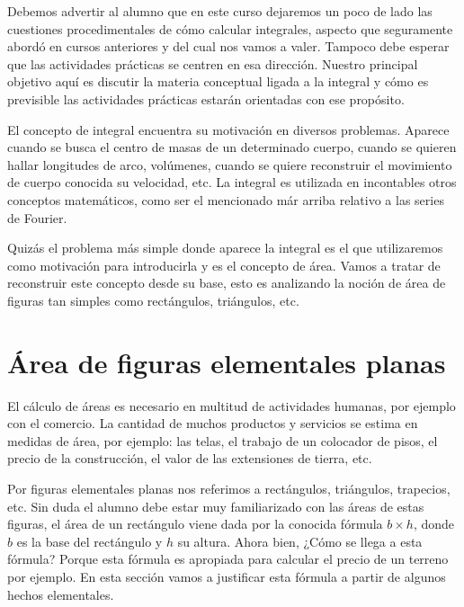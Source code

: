 Debemos advertir  al alumno que en este curso dejaremos un poco de lado las cuestiones procedimentales de cómo calcular integrales, aspecto que seguramente abordó en cursos anteriores y del cual nos vamos a valer. Tampoco debe esperar que las actividades prácticas se centren en esa dirección.   Nuestro principal objetivo aquí es discutir la materia conceptual ligada a la integral y cómo es previsible las actividades prácticas estarán orientadas con ese propósito.


El concepto de integral encuentra su motivación en diversos problemas. Aparece cuando se busca el centro de masas de un determinado cuerpo, cuando se quieren hallar longitudes de arco, volúmenes, cuando se quiere reconstruir el movimiento de cuerpo conocida su velocidad, etc. La integral es utilizada en incontables otros conceptos matemáticos, como ser el mencionado már arriba relativo a las series de Fourier. 

Quizás el 
problema más simple donde aparece la integral es el que utilizaremos como motivación para introducirla y es el concepto de área.  Vamos a tratar de reconstruir este concepto desde su base, esto es analizando la noción de área de figuras tan simples como rectángulos, triángulos, etc. 



\section{Área de figuras elementales planas}\label{sec:area_elem}

  
El cálculo de áreas es necesario en multitud de actividades humanas, por ejemplo con el comercio. La cantidad de muchos productos y servicios se estima en medidas de área, por ejemplo: las telas,  el trabajo de un colocador de pisos,  el precio de la construcción,  el valor de las extensiones de tierra, etc.  
 
 


Por figuras elementales planas nos referimos a rectángulos, triángulos, trapecios, etc. Sin duda el alumno  debe estar  muy familiarizado con las áreas de estas figuras, el área de un rectángulo viene dada por la conocida fórmula $b\times h$, donde $b$ es la base del rectángulo y $h$ su altura.  Ahora bien, ¿Cómo 
se llega a esta fórmula? Porque esta fórmula es apropiada para calcular el precio de un terreno por ejemplo. En esta sección vamos a justificar esta fórmula a partir de algunos hechos elementales.



